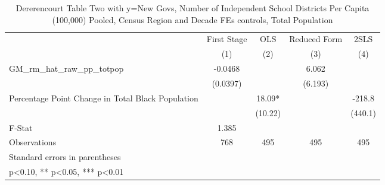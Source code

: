 \begin{table}[htbp]\centering
\def\sym#1{\ifmmode^{#1}\else\(^{#1}\)\fi}
\caption{Dererencourt Table Two with y=New Govs, Number of Independent School Districts Per Capita (100,000) Pooled, Census Region and Decade FEs controls, Total Population}
\begin{tabular}{l*{4}{c}}
\toprule
                    & First Stage   &         OLS   &Reduced Form   &        2SLS   \\
                    &\multicolumn{1}{c}{(1)}   &\multicolumn{1}{c}{(2)}   &\multicolumn{1}{c}{(3)}   &\multicolumn{1}{c}{(4)}   \\
\midrule
GM\_rm\_hat\_raw\_pp\_totpop&     -0.0468   &               &       6.062   &               \\
                    &    (0.0397)   &               &     (6.193)   &               \\
\addlinespace
Percentage Point Change in Total Black Population&               &       18.09*  &               &      -218.8   \\
                    &               &     (10.22)   &               &     (440.1)   \\
\midrule
F-Stat              &       1.385   &               &               &               \\
Observations        &         768   &         495   &         495   &         495   \\
\bottomrule
\multicolumn{5}{l}{\footnotesize Standard errors in parentheses}\\
\multicolumn{5}{l}{\footnotesize * p<0.10, ** p<0.05, *** p<0.01}\\
\end{tabular}
\end{table}
